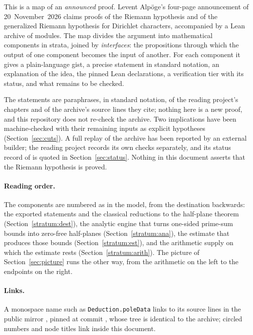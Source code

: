 \documentclass[11pt,a4paper,oneside]{article}
\newcommand\bpcode[1]{\texttt{#1}}
\begin{document}
This is a map of an \emph{announced} proof. Levent Alpöge's four-page announcement of 20~November~2026
claims proofs of the Riemann hypothesis and of the generalized Riemann hypothesis for Dirichlet
characters, accompanied by a Lean archive of \ModuleCount{} modules. The map divides the argument into
\NumComponents{} mathematical components in \NumStrataWord{} strata, joined by \NumInterfaces{} \emph{interfaces}: the
propositions through which the output of one component becomes the input of another. For each component
it gives a plain-language gist, a precise statement in standard notation, an explanation of the idea,
the pinned Lean declarations, a verification tier with its status, and what remains to be checked.

The statements are paraphrases, in standard notation, of the reading project's chapters and of the
archive's source lines they cite; nothing here is a new proof, and this repository does not re-check the
archive. Two implications have been machine-checked with their remaining inputs as explicit hypotheses
(Section~\ref{sec:cuts}). A full replay of the archive has been reported by an external builder; the
reading project records its own checks separately, and its status record of \StatusAsOf{} is quoted in
Section~\ref{sec:status}. Nothing in this document asserts that the Riemann hypothesis is proved.

\paragraph{Reading order.} The components are numbered as in the model, from the destination backwards:
the \NumExportsWord{} exported statements and the classical reductions to the half-plane theorem
(Section~\ref{stratum:dest}), the analytic engine that turns one-sided prime-sum bounds into zero-free
half-planes (Section~\ref{stratum:ana}), the estimate that produces those bounds
(Section~\ref{stratum:est}), and the arithmetic supply on which the estimate rests
(Section~\ref{stratum:arith}). The picture of Section~\ref{sec:picture} runs the other way, from the
arithmetic on the left to the endpoints on the right.

\paragraph{Links.} A monospace name such as \bpcode{Deduction.poleData} links to its source lines in the
public mirror \MirrorName{}, pinned at commit \MirrorCommitShort{}, whose tree is identical to the archive;
circled numbers and node titles link inside this document.
\end{document}
